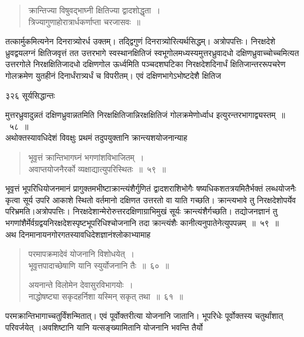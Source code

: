 \documentclass[11pt, openany]{book}
\begin{document}

\begin{quote}
{\qt क्रान्तिज्या विषुवद्भाघ्नी क्षितिज्या द्वादशोद्धृता~।\\
त्रिज्यागुणाहोरात्रार्धकर्णाप्ता चरजासवः~॥}
\end{quote}
 तत्कार्मुकमित्यनेन दिनरात्र्योरर्ध उक्तम्। तद्द्विगुणं दिनरात्र्योरित्यर्थसिद्धम्। अत्रोपपत्तिः। निरक्षदेशे ध्रुवद्वयलग्नं क्षितिजवृत्तं तत उत्तरभागे स्वस्थानक्षितिजं स्वभूगोलमध्यस्यमुत्तरध्रुवादधो दक्षिणध्रुवाच्चोच्चमित्यत उत्तरगोले निरक्षक्षितिजादधो दक्षिणगोल ऊर्ध्वमिति पञ्चदशघटिका निरक्षदेशदिनार्धं क्षितिजान्तररूपचरेण गोलक्रमेण युतहीनं दिनार्धंरात्र्यर्धं च विपरीतम्। एवं दक्षिणभागेऽभोष्टदेशै क्षितिज \textendash


\newpage

\noindent ३२६ \hspace{4cm} सूर्यसिद्धान्तः
\vspace{1cm}


\noindent मुत्तरध्रुवादुन्नतं दक्षिणध्रुवान्नतमिति निरक्षक्षितिजान्निरक्षक्षितिजं गोलक्रमेणोर्ध्वाध इत्युरन्तरभागाद्व्यस्तम्~॥~५८~॥ \\
\noindent अथोक्तस्यावधिदेशं विवक्षुः प्रथमं तदुपयुक्तानि क्रान्त्यशयोजनान्याह \textendash


\begin{quote}
{\ssi भूवृत्तं क्रान्तिभागघ्नं भगणांशविभाजितम्~। \\
अवाप्तयोजनैरर्को व्यक्षाद्यात्युपरिस्थितः~॥~५९~॥}
\end{quote}
 भूवृत्तं भूपरिधियोजनमानं प्रागुक्तमभीष्टाक्रान्त्यंशैर्गुणितं द्वादशराशिभोगैः षष्यधिकशतत्रयमितैर्भक्तं लब्धयोजनैः कृत्वा सूर्य उपरि आकाशे स्थितो वर्तमानो दक्षिणत उत्तरतो वा याति गच्छति। क्रान्त्यभावे तु निरक्षदेशोपर्येव परिभ्रमति।अत्रोपपत्तिः। निरक्षदेशान्मेरोरुत्तरदक्षिणाग्राभिमुखं सूर्यः क्रान्त्यंशैर्गच्छति। तद्योजनज्ञानं तु भगणांशैर्मेर्वग्रद्वयनिरक्षदेशस्पृष्टभूपरिधिश्चोजनानि तदा क्रान्त्यंशैः कानीत्यनुपातेनेत्युपपन्नम्~॥~५९~॥\\
\noindent अथ दिनमानायनगोरगतस्यावधिदेशज्ञानंश्लोकाभ्यामाह \textendash


 \begin{quote}
{\ssi परमापक्रमादेवं योजनानि विशोधयेत्~।\\
भूवृत्तपादाच्छेषाणि यानि स्युर्योजनानि तैः~॥~६०~॥ 

अयनान्ते विलोमेन देवासुरविभागयोः~।\\
नाद्धोषष्ट्या सकृदहर्निशा यस्मिन् सकृत् तथा~॥~६१~॥}
\end{quote}
 परमक्रान्तिभागाच्चतुर्विंशन्मितात्। एवं पूर्वोक्तरीत्या योजनानि जातानि। भूपरिधेः पूर्वोक्तस्य चतुर्थांशात् परिवर्जयेत् ।अवशिष्टानि यानि यत्सङ्ख्यामितानि योजनानि भवन्ति तैर्यो \textendash
\end{document}
